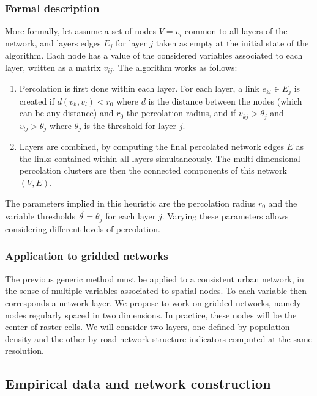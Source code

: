 \documentclass{jimis-en}
\begin{document}
\subsubsection{Formal description}

More formally, let assume a set of nodes $V = v_i$ common to all layers of the network, and layers edges $E_j$ for layer $j$ taken as empty at the initial state of the algorithm. Each node has a value of the considered variables associated to each layer, written as a matrix $v_{ij}$. The algorithm works as follows:
\begin{enumerate}
	\item Percolation is first done within each layer. For each layer, a link $e_{kl} \in E_j$ is created if $d(v_k,v_l) < r_0$ where $d$ is the distance between the nodes (which can be any distance) and $r_0$ the percolation radius, and if $v_{kj} > \theta_j$ and $v_{lj} > \theta_j$ where $\theta_j$ is the threshold for layer $j$.
	\item Layers are combined, by computing the final percolated network edges $E$ as the links contained within all layers simultaneously. The multi-dimensional percolation clusters are then the connected components of this network $(V,E)$.
\end{enumerate}

 
The parameters implied in this heuristic are the percolation radius $r_0$ and the variable thresholds $\vec{\theta} = \theta_j$ for each layer $j$. Varying these parameters allows considering different levels of percolation.



\subsubsection{Application to gridded networks}

The previous generic method must be applied to a consistent urban network, in the sense of multiple variables associated to spatial nodes. To each variable then corresponds a network layer. We propose to work on gridded networks, namely nodes regularly spaced in two dimensions. In practice, these nodes will be the center of raster cells. We will consider two layers, one defined by population density and the other by road network structure indicators computed at the same resolution.



\subsection{Empirical data and network construction}
\end{document}

